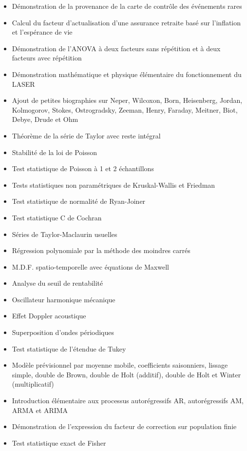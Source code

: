 \begin{itemize}
\begin{itemize}[noitemsep]
				\item Démonstration de la provenance de la carte de contrôle des événements rares
				\item Calcul du facteur d'actualisation d'une assurance retraite basé sur l'inflation et l'espérance de vie
				\item Démonstration de l'ANOVA à deux facteurs sans répétition et à deux facteurs avec répétition
				\item Démonstration mathématique et physique élémentaire du fonctionnement du LASER
				\item Ajout de petites biographies sur Neper, Wilcoxon, Born, Heisenberg, Jordan, Kolmogorov, Stokes, Ostrogradsky, Zeeman, Henry, Faraday,  Meitner, Biot, Debye, Drude et Ohm
				\item Théorème de la série de Taylor avec reste intégral
				\item Stabilité de la loi de Poisson
				\item Test statistique de Poisson à 1 et 2 échantillons
				\item Tests statistiques non paramétriques de Kruskal-Wallis et Friedman
				\item Test statistique de normalité de Ryan-Joiner
				\item Test statistique C de Cochran
				\item Séries de Taylor-Maclaurin usuelles
				\item Régression polynomiale par la méthode des moindres carrés
				\item M.D.F. spatio-temporelle avec équations de Maxwell
				\item Analyse du seuil de rentabilité
				\item Oscillateur harmonique mécanique
				\item Effet Doppler acoustique
				\item Superposition d'ondes périodiques
				\item Test statistique de l'étendue de Tukey
				\item Modèle prévisionnel par moyenne mobile, coefficients saisonniers, lissage simple, double de Brown, double de Holt (additif), double de Holt et Winter (multiplicatif)
				\item Introduction élémentaire aux processus autorégressifs AR, autorégressifs AM, ARMA et ARIMA
				\item Démonstration de l'expression du facteur de correction sur population finie
				\item Test statistique exact de Fisher

\end{itemize}
\end{itemize}
